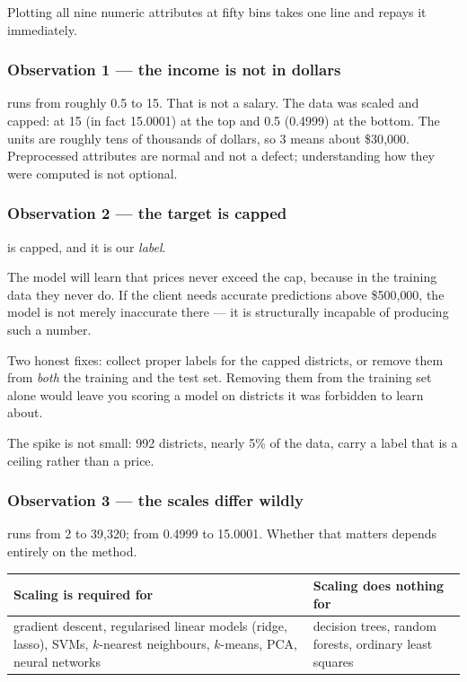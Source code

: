 \documentclass[11pt,a4paper]{article}
\begin{document}
Plotting all nine numeric attributes at fifty bins takes one line and repays it
immediately.

\subsubsection{Observation 1 --- the income is not in dollars}

 runs from roughly 0.5 to 15. That is not a salary. The
data was scaled and capped: at 15 (in fact 15.0001) at the top and 0.5 (0.4999)
at the bottom. The units are roughly tens of thousands of dollars, so 3 means
about \$30{,}000. Preprocessed attributes are normal and not a defect;
understanding how they were computed is not optional.

\subsubsection{Observation 2 --- the target is capped}

 is capped, and it is our \emph{label}.

\begin{failbox}[title={Failure condition --- why a capped label is more serious than a capped feature}]
The model will learn that prices never exceed the cap, because in the training
data they never do. If the client needs accurate predictions above
\$500{,}000, the model is not merely inaccurate there --- it is structurally
incapable of producing such a number.

Two honest fixes: collect proper labels for the capped districts, or remove
them from \emph{both} the training and the test set. Removing them from the
training set alone would leave you scoring a model on districts it was
forbidden to learn about.
\end{failbox}

The spike is not small: 992 districts, nearly 5\% of the data, carry a label
that is a ceiling rather than a price.

\subsubsection{Observation 3 --- the scales differ wildly}

 runs from 2 to 39{,}320;  from 0.4999
to 15.0001. Whether that matters depends entirely on the method.

\begin{center}
\small
\begin{tabular}{p{}p{}}
\toprule
\textbf{Scaling is required for} & \textbf{Scaling does nothing for} \\
\midrule
gradient descent, regularised linear models (ridge, lasso), SVMs,
$k$-nearest neighbours, $k$-means, PCA, neural networks
&
decision trees, random forests, ordinary least squares \\
\bottomrule
\end{tabular}
\end{center}
\end{document}
